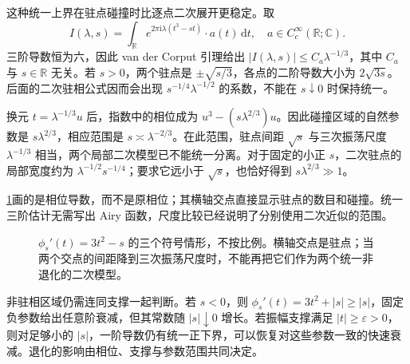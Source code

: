 \ProseParagraphBreak

这种统一上界在驻点碰撞时比逐点二次展开更稳定。取
\[
 I(\lambda,s)=\int_{\mathbb R}
 e^{2\pi\mathrm i\lambda(t^3-st)}\cdot a(t)\,\mathrm dt,
 \quad a\in C_c^\infty(\mathbb R;\mathbb C).
\]
三阶导数恒为六，因此 van der Corput 引理给出
\(|I(\lambda,s)|\leq C_a\lambda^{-1/3}\)，其中 \(C_a\) 与 \(s\in\mathbb R\) 无关。若 \(s>0\)，两个驻点是 \(\pm\sqrt{s/3}\)，各点的二阶导数大小为 \(2\sqrt{3s}\)。后面的二次驻相公式因而会出现 \(s^{-1/4}\lambda^{-1/2}\) 的系数，不能在 \(s\downarrow0\) 时保持统一。

\ProseParagraphBreak

换元 \(t=\lambda^{-1/3}u\) 后，指数中的相位成为
\(u^3-(s\lambda^{2/3})u\)。因此碰撞区域的自然参数是 \(s\lambda^{2/3}\)，相应范围是 \(s\asymp\lambda^{-2/3}\)。在此范围，驻点间距 \(\sqrt{s}\) 与三次振荡尺度 \(\lambda^{-1/3}\) 相当，两个局部二次模型已不能统一分离。对于固定的小正 \(s\)，二次驻点的局部宽度约为 \(\lambda^{-1/2}s^{-1/4}\)；要求它远小于 \(\sqrt{s}\)，也恰好得到 \(s\lambda^{2/3}\gg1\)。

\ProseParagraphBreak

\cref{b2:fig:21-critical-collision}画的是相位导数，而不是原相位；其横轴交点直接显示驻点的数目和碰撞。统一三阶估计无需写出 Airy 函数，尺度比较已经说明了分别使用二次近似的范围。

\begin{figure}[htbp]
\centering
{}
\caption[三次相位的驻点碰撞]{\(\phi_s'(t)=3t^2-s\) 的三个符号情形，不按比例。横轴交点是驻点；当两个交点的间距降到三次振荡尺度时，不能再把它们作为两个统一非退化的二次模型。}
\label{b2:fig:21-critical-collision}
\end{figure}

非驻相区域仍需连同支撑一起判断。若 \(s<0\)，则
\(\phi_s'(t)=3t^2+|s|\geq|s|\)，固定负参数给出任意阶衰减，但其常数随 \(|s|\downarrow0\) 增长。若振幅支撑满足 \(|t|\geq\varepsilon>0\)，则对足够小的 \(|s|\)，一阶导数仍有统一正下界，可以恢复对这些参数一致的快速衰减。退化的影响由相位、支撑与参数范围共同决定。
